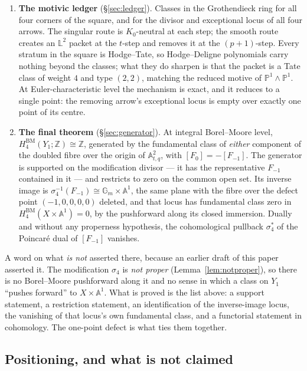 \documentclass[11pt]{article}
\theoremstyle{definition}
\theoremstyle{remark}
\newcommand{\Z}{\mathbb{Z}}
\newcommand{\Aff}[1]{\mathbb{A}^{#1}}
\newcommand{\Gm}{\mathbb{G}_m}
\newcommand{\Lef}{\mathbb{L}}
\newcommand{\PP}{\mathbb{P}}
\newcommand{\HBM}[1]{H^{\mathrm{BM}}_{#1}}
\begin{document}
\begin{enumerate}
\item \textbf{The motivic ledger} (\S\ref{sec:ledger}). Classes in the
Grothendieck ring for all four corners of the square, and for the divisor and
exceptional locus of all four arrows. The singular route is $K_0$-neutral at
each step; the smooth route creates an $\Lef^2$ packet at the $t$-step and
removes it at the $(p+1)$-step. Every stratum in the square is Hodge--Tate, so
Hodge--Deligne polynomials carry nothing beyond the classes; what they do
sharpen is that the packet is a Tate class of weight $4$ and type $(2,2)$,
matching the reduced motive of $\PP^1\wedge\PP^1$. At Euler-characteristic
level the mechanism is exact, and it reduces to a single point: the removing
arrow's exceptional locus is empty over exactly one point of its centre.

\item \textbf{The final theorem} (\S\ref{sec:generator}). At integral
Borel--Moore level, $\HBM{4}(Y_1;\Z)\cong\Z$, generated by the fundamental
class of \emph{either} component of the doubled fibre over the origin of
$\Aff{2}_{t,q}$, with $[F_0]=-[F_{-1}]$. The generator is supported on the
modification divisor --- it has the representative $F_{-1}$ contained in it ---
and restricts to zero on the common open set. Its inverse image is
$\sigma_4^{-1}(F_{-1})\cong\Gm\times\Aff{1}$, the same plane with the fibre
over the defect point $(-1,0,0,0,0)$ deleted, and that locus has fundamental
class zero in $\HBM{4}(X\times\Aff{1})=0$, by the pushforward along its closed
immersion. Dually and without any properness hypothesis, the cohomological
pullback $\sigma_4^{*}$ of the Poincar\'e dual of $[F_{-1}]$ vanishes.
\end{enumerate}

A word on what \emph{is not} asserted there, because an earlier draft of this
paper asserted it. The modification $\sigma_4$ is \emph{not proper}
(Lemma~\ref{lem:notproper}), so there is no Borel--Moore pushforward along it
and no sense in which a class on $Y_1$ ``pushes forward'' to $X\times\Aff{1}$.
What is proved is the list above: a support statement, a restriction
statement, an identification of the inverse-image locus, the vanishing of that
locus's own fundamental class, and a functorial statement in cohomology. The
one-point defect is what ties them together.

\subsection{Positioning, and what is not claimed}\label{sec:positioning}
\end{document}
